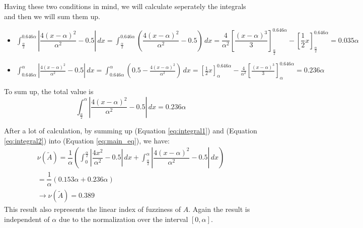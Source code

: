 Having these two conditions in mind, we will calculate seperately the integrals and then we will sum them up.
\begin{itemize}
	\item $\displaystyle \int_{\frac{\alpha}{2}}^{0.646\alpha} \left| \dfrac{4(x-\alpha)^2}{\alpha^2} - 0.5 \right| \, dx = \int_{\frac{\alpha}{2}}^{0.646\alpha}\left(\dfrac{4(x-\alpha)^2}{\alpha^2} - 0.5 \right)\, dx =  \dfrac{4}{\alpha^2}\left[\dfrac{\left(x - \alpha\right)^3}{3}\right]^{0.646\alpha}_{\frac{\alpha}{2}} - \left[\dfrac{1}{2}x\right]^{0.646\alpha}_{\frac{\alpha}{2}} = 0.035\alpha $ 
	\vspace{3mm}
	
	\item $\displaystyle \int_{0.646\alpha}^{\alpha} \left| \frac{4(x-\alpha)^2}{\alpha^2} - 0.5 \right| \, dx =\int_{0.646\alpha}^{\alpha} \left(0.5 - \frac{4(x-\alpha)^2}{\alpha^2} \right) \, dx = \left[\frac{1}{2}x\right]^{0.646\alpha}_{\alpha} -  \frac{4}{\alpha^2}\left[\frac{\left(x - \alpha\right)^3}{3}\right]^{0.646\alpha}_{\alpha} =
	 0.236\alpha
$\end{itemize}
\vspace{4mm}
To sum up, the total value is \\
\begin{equation}
	\displaystyle \int_{\frac{\alpha}{2}}^{\alpha} \left| \dfrac{4(x-\alpha)^2}{\alpha^2} - 0.5 \right| \, dx = 0.236\alpha
	\label{eq:integral2}
\end{equation}

After a lot of calculation, by summing up (Equation \ref{eq:integral1}) and (Equation \ref{eq:integral2}) into (Equation \ref{eq:main_eq}), we have:
\begin{gather*}
	\nu(\tilde{A}) = \dfrac{1}{\alpha} \left( \int_{0}^{\frac{\alpha}{2}} \left| \dfrac{4x^2}{\alpha^2} - 0.5 \right| \, dx + \int_{\frac{\alpha}{2}}^{\alpha} \left| \dfrac{4(x-\alpha)^2}{\alpha^2} - 0.5 \right| \, dx \right) \\
	= \dfrac{1}{\alpha}\left(0.153\alpha + 0.236\alpha \right) \\
	\rightarrow \nu(\tilde{A}) = 0.389
\end{gather*}
This result also represents the linear index of fuzziness of $A$. Again the result is independent of $\alpha$ due to the normalization over the interval $[0,\alpha]$.
\vspace{3mm}




